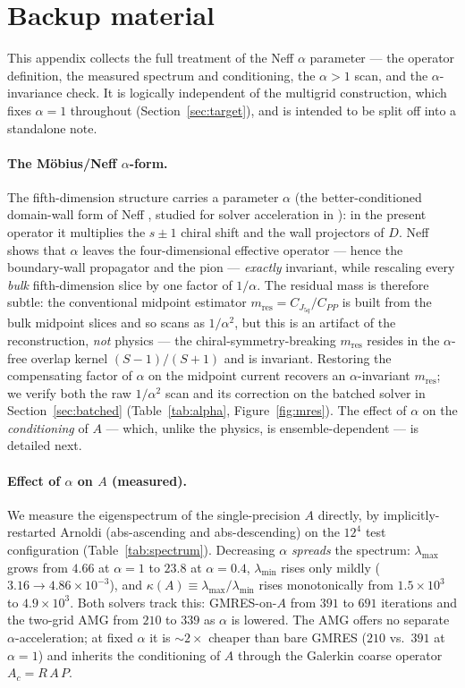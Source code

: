 \documentclass[12pt,a4paper]{article}
\newcommand{\Ddw}{D}
\newcommand{\Aop}{A}
\begin{document}
\appendix
\section{Backup material}
\label{sec:backup}
This appendix collects the full treatment of the Neff $\alpha$ parameter --- the operator definition, the measured spectrum and conditioning, the $\alpha>1$ scan, and the $\alpha$-invariance check. It is logically independent of the multigrid construction, which fixes $\alpha=1$ throughout (Section~\ref{sec:target}), and is intended to be split off into a standalone note.

\paragraph{The M\"obius/Neff $\alpha$-form.} The fifth-dimension structure carries
a parameter $\alpha$ (the better-conditioned domain-wall form of Neff
\cite{NeffOriginal}, studied for solver acceleration in \cite{ChenAlpha}): in the
present operator it
multiplies the $s\!\pm\!1$ chiral shift and the wall projectors of $\Ddw$. Neff
shows \cite{NeffOriginal} that $\alpha$ leaves the four-dimensional effective
operator --- hence the boundary-wall propagator and the pion --- \emph{exactly}
invariant, while rescaling every \emph{bulk} fifth-dimension slice by one factor
of $1/\alpha$. The residual mass is therefore subtle: the conventional midpoint
estimator $m_{\mathrm{res}}=C_{J_{5q}}/C_{PP}$ is built from the bulk midpoint
slices and so scans as $1/\alpha^2$, but this is an artifact of the
reconstruction, \emph{not} physics --- the chiral-symmetry-breaking
$m_{\mathrm{res}}$ resides in the $\alpha$-free overlap kernel $(S\!-\!1)/(S\!+\!1)$
and is invariant. Restoring the compensating factor of $\alpha$ on the midpoint
current recovers an $\alpha$-invariant $m_{\mathrm{res}}$; we verify both the raw
$1/\alpha^2$ scan and its correction on the batched solver in
Section~\ref{sec:batched} (Table~\ref{tab:alpha}, Figure~\ref{fig:mres}). The
effect of $\alpha$ on the \emph{conditioning} of $\Aop$ --- which, unlike the
physics, is ensemble-dependent --- is detailed next.

\paragraph{Effect of $\alpha$ on $\Aop$ (measured).}
We measure the eigenspectrum of the single-precision $\Aop$ directly, by
implicitly-restarted Arnoldi (abs-ascending and abs-descending) on the $12^4$ test
configuration (Table~\ref{tab:spectrum}). Decreasing $\alpha$ \emph{spreads} the
spectrum: $\lambda_{\max}$ grows from $4.66$ at $\alpha\!=\!1$ to $23.8$ at
$\alpha\!=\!0.4$, $\lambda_{\min}$ rises only mildly ($3.16\to4.86\times10^{-3}$),
and $\kappa(\Aop)\equiv\lambda_{\max}/\lambda_{\min}$ rises monotonically from
$1.5\times10^3$ to $4.9\times10^3$. Both solvers track this: GMRES-on-$\Aop$ from
$391$ to $691$ iterations and the two-grid AMG from $210$ to $339$ as $\alpha$ is
lowered. The AMG offers no separate $\alpha$-acceleration; at fixed $\alpha$ it is
${\sim}2\times$ cheaper than bare GMRES ($210$ vs.\ $391$ at $\alpha=1$) and
inherits the conditioning of $\Aop$ through the Galerkin coarse operator
$\Aop_c=R\,\Aop\,P$.
\end{document}
